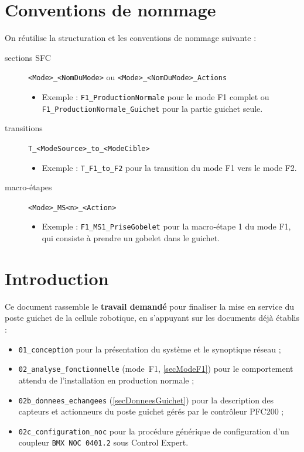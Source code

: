 \section*{Conventions de nommage}
On réutilise la structuration et les conventions de nommage suivante : 
\begin{description}
    \item[sections SFC] \texttt{<Mode>\_<NomDuMode>} ou \texttt{<Mode>\_<NomDuMode>\_Actions}
    \begin{itemize}
        \item Exemple : \texttt{F1\_ProductionNormale} pour le mode F1 complet ou \texttt{F1\_ProductionNormale\_Guichet} pour la partie guichet seule.
    \end{itemize}
    \item[transitions] \texttt{T\_<ModeSource>\_to\_<ModeCible>}
    \begin{itemize}
        \item Exemple : \texttt{T\_F1\_to\_F2} pour la transition du mode F1 vers le mode F2.
    \end{itemize}
    \item[macro-étapes] \texttt{<Mode>\_MS<n>\_<Action>}
    \begin{itemize}
        \item Exemple : \texttt{F1\_MS1\_PriseGobelet} pour la macro-étape 1 du mode F1, qui consiste à prendre un gobelet dans le guichet.
    \end{itemize}   
\end{description}


\section{Introduction}
\label{secIntroduction}

Ce document rassemble le \textbf{travail demandé} pour finaliser la mise en
service du poste guichet de la cellule robotique, en s'appuyant sur les
documents déjà établis :

\begin{itemize}
    \item \texttt{01\_conception} pour la présentation du système et le
    synoptique réseau ;
    \item \texttt{02\_analyse\_fonctionnelle} (mode~F1,
    \ref{secModeF1}) pour le comportement attendu de l'installation en
    production normale ;
    \item \texttt{02b\_donnees\_echangees} (\ref{secDonneesGuichet}) pour
    la description des capteurs et actionneurs du poste guichet gérés par
    le contrôleur PFC200 ;
    \item \texttt{02c\_configuration\_noc} pour la procédure générique de
    configuration d'un coupleur \texttt{BMX~NOC~0401.2} sous Control
    Expert.
\end{itemize}

